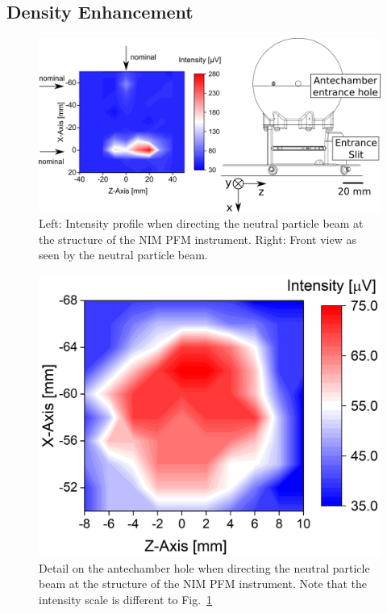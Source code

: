 	\subsection{Density Enhancement}\label{chap:expDensEntSlit}
	\begin{figure}[h!]
		\centering
		\includegraphics[width=\textwidth]{Experiments/2D_scan_anteEntr.png}
		\caption{Left: Intensity profile when directing the neutral particle beam at the structure of the NIM PFM instrument. Right: Front view as seen by the neutral particle beam.}
		\label{exp:PFMIntCharTot}
	\end{figure}
	\begin{figure}[h!]
		\centering
		\includegraphics[width=.6\textwidth]{Experiments/2D_scan_Ant.png}
		\caption{Detail on the antechamber hole when directing the neutral particle beam at the structure of the NIM PFM instrument. Note that the intensity scale is different to Fig.~\ref{exp:PFMIntCharTot}}
		\label{exp:PFMIntCharAnt}
	\end{figure}	
